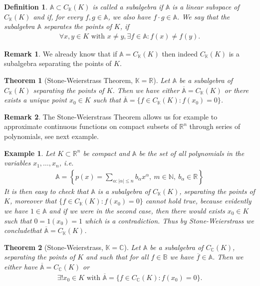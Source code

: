 \documentclass[11pt,a4paper]{article}
\newtheorem{thm}{Theorem}[section]
\newtheorem{defn}{Definition}[section]
\newtheorem{exmp}{Example}[section]
\theoremstyle{definition}
\newtheorem{rem}{Remark}[section]
\begin{document}
\newpage
\begin{defn} $\mathbb{A} \subset C_\mathbb{K}(K)$ is called a subalgebra if $\mathbb{A}$ is a linear subspace of $C_\mathbb{K}(K)$ and if, for every $f,g \in \mathbb{A}$, we also have $f \cdot g \in \mathbb{A}$. We say that the subalgebra $\mathbb{A}$ separates the points of $K$, if 
\begin{align*}
\forall x,y \in K \text{ with } x \neq y, \exists f \in \mathbb{A} : f(x) \neq f(y). 
\end{align*}
\end{defn}
\begin{rem} We already know that if $\mathbb{A}= C_\mathbb{K}(K)$ then indeed $C_\mathbb{K}(K)$ is a subalgebra separating the points of $K$. 
\end{rem}
\begin{thm}[Stone-Weierstrass Theorem, $\mathbb{K}= \mathbb{R}$] Let $\mathbb{A}$ be a subalgebra of $C_\mathbb{K}(K)$ separating the points of $K$. Then we have either $\overline{\mathbb{A}}= C_\mathbb{K}(K)$ or there exists a unique point $x_0 \in K$ such that $\overline{\mathbb{A}}= \lbrace f \in C_\mathbb{K}(K) : f(x_0)=0 \rbrace$. 
\end{thm}
\begin{rem} The Stone-Weierstrass Theorem allows us for example to approximate continuous functions on compact subsets of $\mathbb{R}^n$ through series of polynomials, see next example.
\end{rem}
\begin{exmp} Let $K \subset \mathbb{R}^n$ be compact and $\mathbb{A}$ be the set of all polynomials in the variables $x_1, \dots , x_n$, i.e. 
\begin{align*}
\mathbb{A}= \left\{ p(x) = \sum_{ \alpha : | \alpha| \leq n } b_\alpha x^\alpha, \ m \in \mathbb{N}, \ b_\alpha \in \mathbb{R} \right\} 
\end{align*}
It is then easy to check that $\mathbb{A}$ is a subalgebra of $C_\mathbb{K}(K)$, separating the points of $K$, moreover that $\lbrace f \in C_\mathbb{K}(K) : f(x_0)=0 \rbrace$ cannot hold true, because evidently we have $1 \in \mathbb{A}$ and if we were in the second case, then there would exists $x_0 \in K$ such that $0=1(x_0)=1$ which is a contradiction. Thus by Stone-Weierstrass we concludethat $\overline{\mathbb{A}} = C_\mathbb{K}(K)$. 
\end{exmp}
\begin{thm}[Stone-Weierstrass, $\mathbb{K}= \mathbb{C}$] Let $\mathbb{A}$ be a subalgebra of $C_\mathbb{C}(K)$, separating the points of $K$ and such that for all $f \in \mathbb{B}$ we have $\overline{f} \in \mathbb{A}$. Then we either have $\overline{\mathbb{A}}= C_\mathbb{C}(K)$ or 
\begin{align*}
\exists ! x_0 \in K \text{ with } \overline{\mathbb{A}}= \lbrace f \in C_\mathbb{C}(K) : f(x_0)=0 \rbrace. 
\end{align*}
\end{thm}
\end{document}

